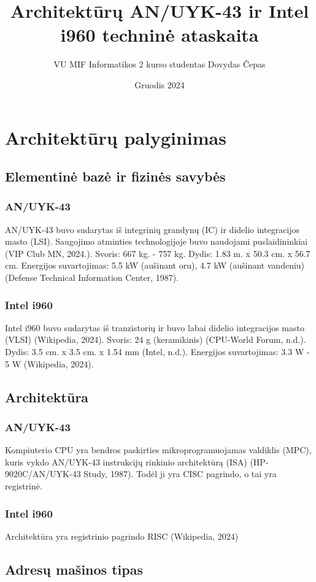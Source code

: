 \documentclass{article}
\title{Architektūrų AN/UYK-43 ir Intel i960 techninė ataskaita}
\author{VU MIF Informatikos 2 kurso studentas Dovydas Čepas}
\date{Gruodis 2024}
\begin{document}
\maketitle
\newpage
\section{Architektūrų palyginimas}
\subsection{Elementinė bazė ir fizinės savybės}
\subsubsection{AN/UYK-43}
AN/UYK-43 buvo sudarytas iš integrinių grandynų (IC) ir didelio integracijos masto (LSI). Saugojimo atminties technologijoje buvo naudojami puslaidininkiai (VIP Club MN, 2024.). Svoris: 667 kg. - 757 kg. Dydis: 1.83 m. x 50.3 cm. x 56.7 cm. Energijos suvartojimas: 5.5 kW (aušinant oru), 4.7 kW (aušinant vandeniu) (Defense Technical Information Center, 1987).

\subsubsection{Intel i960}
Intel i960 buvo sudarytas iš tranzistorių ir buvo labai didelio integracijos masto (VLSI) (Wikipedia, 2024). Svoris: 24 g (keramikinis) (CPU-World Forum, n.d.). Dydis: 3.5 cm. x 3.5 cm. x 1.54 mm (Intel, n.d.). Energijos suvartojimas: 3.3 W - 5 W (Wikipedia, 2024).

\subsection{Architektūra}
\subsubsection{AN/UYK-43}
Kompiuterio CPU yra bendros paskirties mikroprogramuojamas valdiklis (MPC), kuris vykdo AN/UYK-43 instrukcijų rinkinio architektūrą (ISA) (HP-9020C/AN/UYK-43 Study, 1987). Todėl ji yra CISC pagrindo, o tai yra registrinė.
\subsubsection{Intel i960}
Architektūra yra registrinio pagrindo RISC (Wikipedia, 2024)
\subsection{Adresų mašinos tipas}
\end{document}
